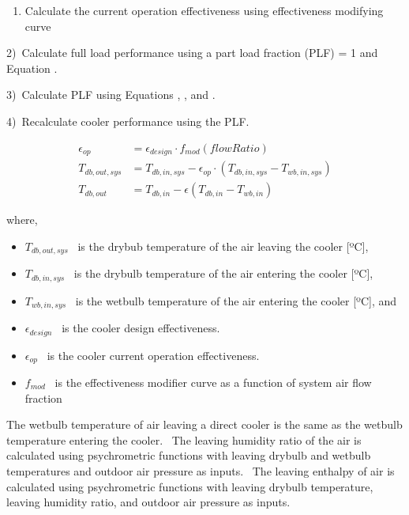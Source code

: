 \begin{enumerate}
\def\labelenumi{\arabic{enumi})}
\tightlist
\item
  Calculate the current operation effectiveness using effectiveness modifying curve
\end{enumerate}

2)~Calculate full load performance using a part load fraction (PLF) = 1 and Equation .

3)~Calculate PLF using Equations , , and .

4)~Recalculate cooler performance using the PLF.

\begin{equation}
 \begin{array}{rl}
  \epsilon_{op} & = \epsilon_{design}\cdot f_{mod}\left(flowRatio\right) \\
  T_{db,out,sys} & = T_{db,in,sys} - \epsilon_{op}\cdot\left(T_{db,in,sys}-T_{wb,in,sys}\right) \\
  T_{db,out} & = T_{db,in}-\epsilon\left(T_{db,in}-T_{wb,in}\right)
 \end{array}
\end{equation}

where,

\begin{itemize}
\item
  \({T_{db,out,sys}}\) ~is the drybub temperature of the air leaving the cooler {[}ºC{]},
\item
  \({T_{db,in,sys}}\) ~is the drybulb temperature of the air entering the cooler {[}ºC{]},
\item
  \({T_{wb,in,sys}}\) ~is the wetbulb temperature of the air entering the cooler {[}ºC{]}, and
\item
  \(\epsilon_{design}\) ~is the cooler design effectiveness.
\item
  \(\epsilon_{op}\) ~is the cooler current operation effectiveness.
\item
  \(f_{mod}\) ~is the effectiveness modifier curve as a function of system air flow fraction
\end{itemize}

The wetbulb temperature of air leaving a direct cooler is the same as the wetbulb temperature entering the cooler.~ The leaving humidity ratio of the air is calculated using psychrometric functions with leaving drybulb and wetbulb temperatures and outdoor air pressure as inputs.~ The leaving enthalpy of air is calculated using psychrometric functions with leaving drybulb temperature, leaving humidity ratio, and outdoor air pressure as inputs.

